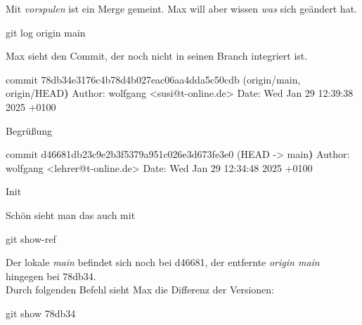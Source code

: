 \documentclass[
  letterpaper,
  DIV=11]{scrreprt}
\newenvironment{Shaded}{\begin{snugshade}}{\end{snugshade}}
\newcommand{\AttributeTok}[1]{\textcolor[rgb]{0.40,0.45,0.13}{#1}}
\newcommand{\ErrorTok}[1]{\textcolor[rgb]{0.68,0.00,0.00}{#1}}
\newcommand{\ExtensionTok}[1]{\textcolor[rgb]{0.00,0.23,0.31}{#1}}
\newcommand{\FunctionTok}[1]{\textcolor[rgb]{0.28,0.35,0.67}{#1}}
\newcommand{\KeywordTok}[1]{\textcolor[rgb]{0.00,0.23,0.31}{\textbf{#1}}}
\newcommand{\NormalTok}[1]{\textcolor[rgb]{0.00,0.23,0.31}{#1}}
\newcommand{\OperatorTok}[1]{\textcolor[rgb]{0.37,0.37,0.37}{#1}}
\newcommand{\branch}[1]{\textit{#1}\xspace}
\begin{document}
Mit \emph{vorspulen} ist ein Merge gemeint. Max will aber wissen
\emph{was} sich geändert hat.

\begin{Shaded}
\begin{Highlighting}[]
\FunctionTok{git}\NormalTok{ log origin main}
\end{Highlighting}
\end{Shaded}

Max sieht den Commit, der noch nicht in seinen Branch integriert ist.

\begin{Shaded}
\begin{Highlighting}[]
\ExtensionTok{commit}\NormalTok{ 78db34e3176c4b78d4b027eac06aa4dda5c50cdb }\ErrorTok{(}\ExtensionTok{origin/main,}\NormalTok{ origin/HEAD}\KeywordTok{)}
\ExtensionTok{Author:}\NormalTok{ wolfgang }\OperatorTok{\textless{}}\NormalTok{susi@t{-}online.de}\OperatorTok{\textgreater{}}
\ExtensionTok{Date:}\NormalTok{   Wed Jan 29 12:39:38 2025 +0100}

    \ExtensionTok{Begrüßung}

\ExtensionTok{commit}\NormalTok{ d46681db23c9e2b3f5379a951c026e3d673fe3e0 }\ErrorTok{(}\ExtensionTok{HEAD} \AttributeTok{{-}}\OperatorTok{\textgreater{}}\NormalTok{ main}\KeywordTok{)}
\ExtensionTok{Author:}\NormalTok{ wolfgang }\OperatorTok{\textless{}}\NormalTok{lehrer@t{-}online.de}\OperatorTok{\textgreater{}}
\ExtensionTok{Date:}\NormalTok{   Wed Jan 29 12:34:48 2025 +0100}

    \ExtensionTok{Init}
\end{Highlighting}
\end{Shaded}

Schön sieht man das auch mit

\begin{Shaded}
\begin{Highlighting}[]
\FunctionTok{git}\NormalTok{ show{-}ref}
\end{Highlighting}
\end{Shaded}

Der lokale \branch{main} befindet sich noch bei d46681, der entfernte
\branch{origin main} hingegen bei 78db34.\\
Durch folgenden Befehl sieht Max die Differenz der Versionen:

\begin{Shaded}
\begin{Highlighting}[]
\FunctionTok{git}\NormalTok{ show 78db34}
\end{Highlighting}
\end{Shaded}
\end{document}
